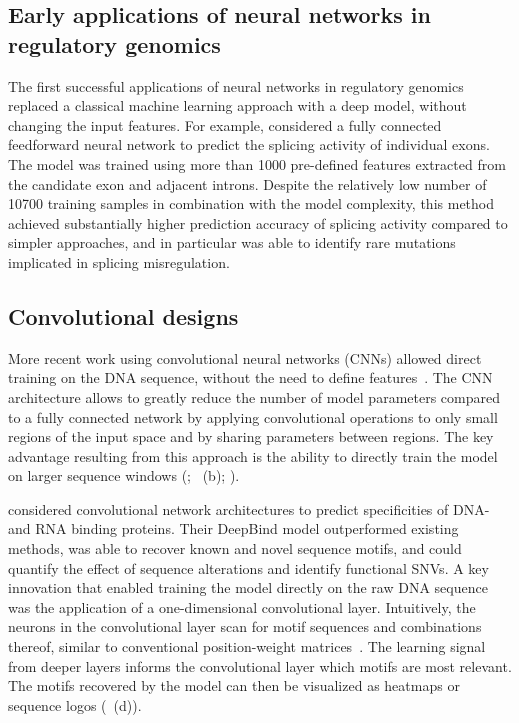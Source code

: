 \subsection{Early applications of neural networks in regulatory genomics}

The first successful applications of neural networks in regulatory genomics replaced a classical machine learning approach with a deep model, without changing the input features. For example, \citet{xiong_human_2015} considered a fully connected feedforward neural network to predict the splicing activity of individual exons. The model was trained using more than 1000 pre-defined features extracted from the candidate exon and adjacent introns. Despite the relatively low number of 10700 training samples in combination with the model complexity, this method achieved substantially higher prediction accuracy of splicing activity compared to simpler approaches, and in particular was able to identify rare mutations implicated in splicing misregulation.


\subsection{Convolutional designs}

More recent work using convolutional neural networks (CNNs) allowed direct training on the DNA sequence, without the need to define features~\citep{alipanahi_predicting_2015,angermueller_accurate_2017,kelley_basset:_2016,zhou_predicting_2015}. The CNN architecture allows to greatly reduce the number of model parameters compared to a fully connected network by applying convolutional operations to only small regions of the input space and by sharing parameters between regions. The key advantage resulting from this approach is the ability to directly train the model on larger sequence windows (; ~(b); ).

\citet{alipanahi_predicting_2015} considered convolutional network architectures to predict specificities of DNA- and RNA binding proteins. Their DeepBind model outperformed existing methods, was able to recover known and novel sequence motifs, and could quantify the effect of sequence alterations and identify functional SNVs. A key innovation that enabled training the model directly on the raw DNA sequence was the application of a one-dimensional convolutional layer. Intuitively, the neurons in the convolutional layer scan for motif sequences and combinations thereof, similar to conventional position-weight matrices~\citep{stormo_use_1982}. The learning signal from deeper layers informs the convolutional layer which motifs are most relevant. The motifs recovered by the model can then be visualized as heatmaps or sequence logos (~(d)).


